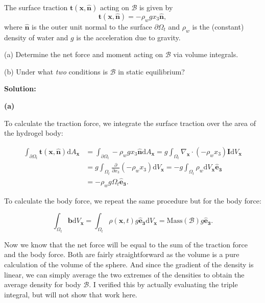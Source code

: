 \vspace{-1em}
The surface traction $\bm{t}(\bm{x},\hat{\bm{n}})$ acting on $\mathcal{B}$ is given by 
\begin{equation*}
\bm{t}(\bm{x},\hat{\bm{n}}) = -\rho_w g x_3 \hat{\bm{n}},
\end{equation*}
where $\hat{\bm{n}}$ is the outer unit normal to the surface $\partial \Omega_t$ and $\rho_w$ is the (constant) density of water and $g$ is the acceleration due to gravity. 

\medskip
(a) Determine the net force and moment acting on $\mathcal{B}$ via volume integrals.

\medskip
(b) Under what \textit{two} conditions is $\mathcal{B}$ in static equilibrium?

\textbf{Solution:}

\textbf{(a)}

To calculate the traction force, we integrate the surface traction over the area of the hydrogel body:

\begin{align*}
    \int_{\partial \Omega_t} \bm{t}(\bm{x}, \bm{\hat{n}}) \textrm{d}A_{\bm{x}} &= \int_{\partial \Omega_t} -\rho_w g x_3 \bm{\hat{n}} \textrm{d}A_{\bm{x}} = g \int_{\Omega_t} \nabla_{\bm{x}} \cdot (-\rho_w x_3) \bm{I} \textrm{d}V_{\bm{x}}\\
    &= g \int_{\Omega_t} \frac{\partial}{\partial x_3} (-\rho_w x_3) \textrm{d}V_{\bm{x}} = -g \int_{\Omega_t} \rho_w \textrm{d}V_{\bm{x}} \bm{\hat{e}_3}\\
    &= -\rho_w g \Omega_t \bm{\hat{e}_3}.
\end{align*}

To calculate the body force, we repeat the same procedure but for the body force:

\begin{equation*}
    \int_{\Omega_t} \bm{b} \textrm{d}V_{\bm{x}} = \int_{\Omega_t} \rho(\bm{x}, t) g \bm{\hat{e}_3} \textrm{d}V_{\bm{x}} = \textrm{Mass}(\mathcal{B}) g \bm{\hat{e}_3}.
\end{equation*}

Now we know that the net force will be equal to the sum of the traction force and the body force. Both are fairly straightforward as the volume is a pure calculation of the volume of the sphere. And since the gradient of the density is linear, we can simply average the two extremes of the densities to obtain the average density for body $\mathcal{B}$. I verified this by actually evaluating the triple integral, but will not show that work here.

